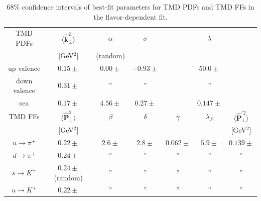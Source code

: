 \documentclass[aps,preprintnumbers,showpacs,nofootinbib,superscriptaddress,floatfix]{revtex4}
\newcommand{\T}{\perp}
\begin{document}
\begin{table}[h!]
\small
  \centering
  \begin{tabular}{|c||c|c|c|c|c|c|}
\hline
\hline
TMD PDFs&  $\big \langle \hat{\bm{k}}_{\T}^2 \big \rangle$ 
& $\alpha$ & $\sigma$ & & $\lambda$ &  
 \\ 
        & {[GeV$^2$]}                               &
      (random) &      &  & & \\
\hline
up valence 
& $0.15 \pm  $ & $0.00 \pm   $ & $-0.93 \pm  $  &  & $50.0 \pm  $ &
\\
\hline
down valence 
& $0.31 \pm  $ & '' & ''  &  & '' &    \\
\hline
sea 
& $0.17 \pm  $ & $4.56 \pm   $ & $0.27 \pm  $  &  & $0.147 \pm  $ &    \\
\hline
\hline
TMD FFs&  $\big \langle \hat{\bm{P}}_{\perp}^2 \big \rangle$ &
$\beta$ & $\delta$ & $\gamma$ & $\lambda_F$ & $\big \langle
\hat{\bm{P}}_{\perp}^{\prime 2} \big \rangle$
 \\ 
        & {[GeV$^2$]} &            &         & & &{[GeV$^2$]}    \\
\hline
$u \to \pi^+$   &  $0.22 \pm $ & $2.6 \pm  $ & $2.8 \pm $ 
      & $0.062 \pm $ & $5.9 \pm $ & $0.139 \pm $  \\
\hline
$d \to \pi^+$  &  $0.24 \pm $ & '' & '' & '' & '' & ''  \\
\hline
$\bar{s} \to K^+$ &  $0.24 \pm$ (random) & '' & '' & '' & '' & ''   \\
\hline
$u \to K^+$   &  $0.22 \pm $ & '' & '' & '' & '' & ''  \\
\hline
\hline
\end{tabular}
\caption{$68\%$ confidence intervals of best-fit parameters for TMD PDFs and TMD FFs in the flavor-dependent fit.}
\label{t:fl_dep_par_TMD}
\end{table}
\end{document}
